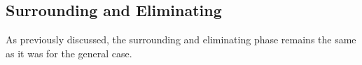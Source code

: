 \subsection{Surrounding and Eliminating}
As previously discussed, the surrounding and eliminating phase remains the same as it was for the general case.

